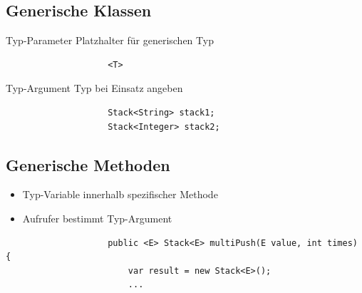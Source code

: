 \documentclass[a4paper, landscape, 8pt]{scrartcl}
\begin{document}
\begin{multicols*}{4}
            \subsection{Generische Klassen}
                \textcolor{subsectioncolor}{Typ-Parameter}
                \newline
                Platzhalter für generischen Typ
                \begin{lstlisting}
                    <T>
                \end{lstlisting}

                \textcolor{subsectioncolor}{Typ-Argument}
                \newline
                Typ bei Einsatz angeben
                \begin{lstlisting}
                    Stack<String> stack1;
                    Stack<Integer> stack2;
                \end{lstlisting}

            \subsection{Generische Methoden}
                \begin{itemize}
                    \item Typ-Variable innerhalb spezifischer Methode
                    \item Aufrufer bestimmt Typ-Argument
                \end{itemize}
                \begin{lstlisting}
                    public <E> Stack<E> multiPush(E value, int times) {
                        var result = new Stack<E>();
                        ...
                \end{lstlisting}


\end{multicols*}
\end{document}
